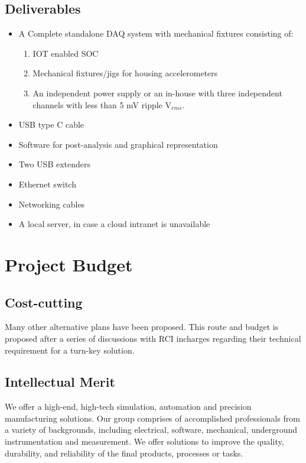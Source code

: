 \documentclass{FR16}
\begin{document}
\subsection{Deliverables}

\begin{itemize}
    \item A Complete standalone DAQ system with mechanical fixtures consisting of:
     \begin{enumerate}
         \item IOT enabled SOC 
         \item Mechanical fixtures/jigs for housing accelerometers
         \item An independent power supply or an in-house with three independent channels with less than 5 mV ripple V$_{rms}$.
     \end{enumerate}
    \item USB type C cable
    \item Software for post-analysis and graphical representation
    \item Two USB extenders 
    \item Ethernet switch
    \item Networking cables
    \item A local server, in case a cloud intranet is unavailable
 \end{itemize}

\section{Project Budget}
 \subsection{Cost-cutting}
Many other alternative plans have been proposed. This route and budget is proposed after a series of discussions with RCI incharges regarding their technical requirement for a turn-key solution.

\subsection{Intellectual Merit}
We offer a high-end, high-tech simulation, automation and precision  manufacturing solutions. Our group comprises of accomplished professionals from a variety of backgrounds, including electrical, software, mechanical,  underground instrumentation and measurement. We offer solutions to improve the quality, durability, and reliability of the final products, processes or tasks. 
\end{document}
